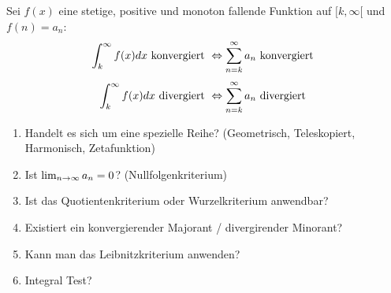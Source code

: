 
\begin{tcolorbox}
	Sei $f(x)$ eine stetige, positive und monoton fallende Funktion auf $[k, \infty[$ und $f(n) = a_n$:
	$$\int_k^\infty f(x)dx \text{ konvergiert } \Leftrightarrow \sum\limits_{n = k}^{\infty} a_n \text{ konvergiert }$$
	$$\int_k^\infty f(x)dx \text{ divergiert } \Leftrightarrow \sum\limits_{n = k}^{\infty} a_n \text{ divergiert }$$
\end{tcolorbox}



\begin{enumerate}[label=(\arabic*)]
	\item Handelt es sich um eine spezielle Reihe? (Geometrisch, Teleskopiert, Harmonisch, Zetafunktion)
	\item Ist $\lim_{n \rightarrow \infty} a_n = 0$? (Nullfolgenkriterium)
	\item Ist das Quotientenkriterium oder Wurzelkriterium anwendbar?
	\item Existiert ein konvergierender Majorant / divergirender Minorant?
	\item Kann man das Leibnitzkriterium anwenden?
	\item Integral Test?
\end{enumerate}
